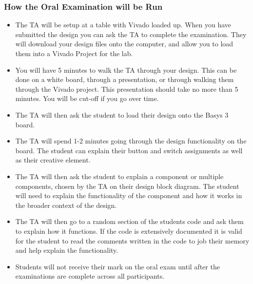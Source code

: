 \vspace{1cm}

\subsubsection{How the Oral Examination will be Run}

\begin{itemize}
    \item The TA will be setup at a table with Vivado loaded up. When you have submitted the design you can ask the TA to complete the examination. They will download your design files onto the computer, and allow you to load them into a Vivado Project for the lab. 
    \item You will have 5 minutes to walk the TA through your design. This can be done on a white board, through a presentation, or through walking them through the Vivado project. This presentation should take no more than 5 minutes. You will be cut-off if you go over time.\\
    \item The TA will then ask the student to load their design onto the Basys 3 board.
    \item The TA will spend 1-2 minutes going through the design functionality on the board. The student can explain their button and switch assignments as well as their creative element.
    \item The TA will then ask the student to explain a component or multiple components, chosen by the TA on their design block diagram. The student will need to explain the functionality of the component and how it works in the broader context of the design.
    \item The TA will then go to a random section of the students code and ask them to explain how it functions. If the code is extensively documented it is valid for the student to read the comments written in the code to job their memory and help explain the functionality. 

    \item Students will not receive their mark on the oral exam until after the examinations are complete across all participants.
\end{itemize}

